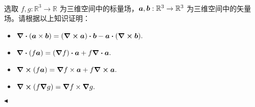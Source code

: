 \documentclass[11pt]{article}
\newenvironment{question}[2][Question]{\begin{trivlist}
\item[\hskip \labelsep {\bfseries #1}\hskip \labelsep {\bfseries #2.}]}{\hfill$\blacktriangleleft$\end{trivlist}}
\newcommand{\RR}{\mathbb{R}}
\begin{document}
    \begin{question}{5 (16') (外微分)}~\\
    选取 $f, g: \RR^3 \to \RR$ 为三维空间中的标量场，$\vb*{a}, \vb*{b}: \RR^3 \to \RR^3$ 为三维空间中的矢量场。请根据以上知识证明：
    \begin{itemize}
        \item [a (4')] $\div(\vb*{a} \times \vb*{b}) = (\curl{\vb*{a}}) \vdot \vb*{b} - \vb*{a} \vdot (\curl{\vb*{b}}).$
        \item [b (4')] $\div(f\vb*{a}) = \qty(\grad f) \vdot \vb*{a} + f\div{\vb*{a}}.$
        \item [c (4')] $\curl(f\vb*{a}) = \grad f \times \vb*{a} + f \curl{\vb*{a}}.$
        \item [d (4')] $\curl(f \grad g) = \grad f \times \grad g.$
    \end{itemize}

    \end{question}

    
\end{document}
